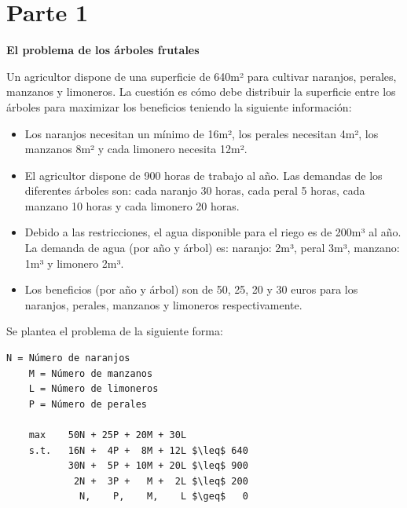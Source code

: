 \documentclass[13pt,a4paper]{article}
\begin{document}
    
    
    \newpage


\section{Parte 1}

\textbf{El problema de los árboles frutales}

\vspace{\baselineskip}

Un agricultor dispone de una superficie de 640m² para cultivar naranjos, perales, manzanos y
limoneros. La cuestión es cómo debe distribuir la superficie entre los árboles para maximizar
los beneficios teniendo la siguiente información:

\begin{itemize}
    \item Los naranjos necesitan un mínimo de 16m², los perales necesitan 4m², los manzanos 8m² y cada limonero necesita 12m².
    \item El agricultor dispone de 900 horas de trabajo al año. Las demandas de los diferentes árboles son: cada naranjo 30 horas, cada peral 5 horas, cada manzano 10 horas y cada limonero 20 horas.
    \item Debido a las restricciones, el agua disponible para el riego es de 200m³ al año. La demanda de agua (por año y árbol) es: naranjo: 2m³, peral 3m³, manzano: 1m³ y limonero 2m³.
    \item Los beneficios (por año y árbol) son de 50, 25, 20 y 30 euros para los naranjos, perales, manzanos y limoneros respectivamente.
\end{itemize}

Se plantea el problema de la siguiente forma:
\begin{lstlisting}[mathescape=true]
    N = Número de naranjos
    M = Número de manzanos
    L = Número de limoneros
    P = Número de perales

    max    50N + 25P + 20M + 30L 
    s.t.   16N +  4P +  8M + 12L $\leq$ 640
           30N +  5P + 10M + 20L $\leq$ 900
            2N +  3P +   M +  2L $\leq$ 200
             N,    P,    M,    L $\geq$   0
\end{lstlisting}
\end{document}
